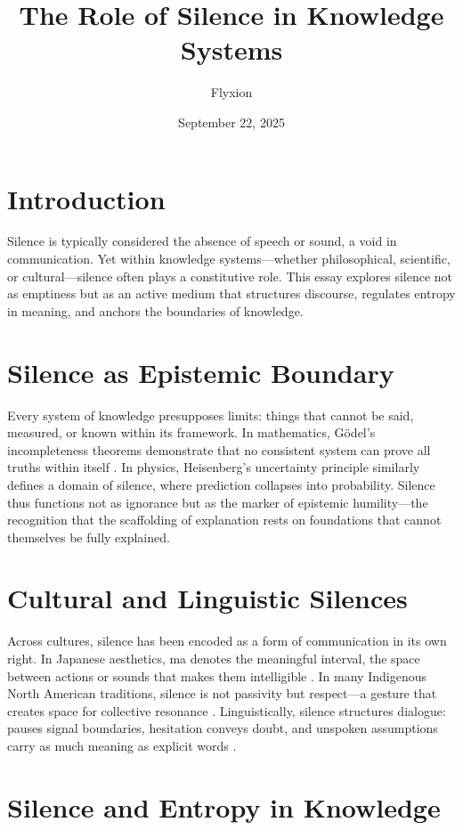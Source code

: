\documentclass[11pt,a4paper]{article}
\title{The Role of Silence in Knowledge Systems}
\author{Flyxion}
\date{September 22, 2025}
\begin{document}
\maketitle

\section{Introduction}

Silence is typically considered the absence of speech or sound, a void in communication. Yet within knowledge systems—whether philosophical, scientific, or cultural—silence often plays a constitutive role. This essay explores silence not as emptiness but as an active medium that structures discourse, regulates entropy in meaning, and anchors the boundaries of knowledge.

\section{Silence as Epistemic Boundary}

Every system of knowledge presupposes limits: things that cannot be said, measured, or known within its framework. In mathematics, Gödel’s incompleteness theorems demonstrate that no consistent system can prove all truths within itself \citep{godel1931}. In physics, Heisenberg’s uncertainty principle \citep{heisenberg1927} similarly defines a domain of silence, where prediction collapses into probability. Silence thus functions not as ignorance but as the marker of epistemic humility—the recognition that the scaffolding of explanation rests on foundations that cannot themselves be fully explained.

\section{Cultural and Linguistic Silences}

Across cultures, silence has been encoded as a form of communication in its own right. In Japanese aesthetics, ma denotes the meaningful interval, the space between actions or sounds that makes them intelligible \citep{isozaki2006}. In many Indigenous North American traditions, silence is not passivity but respect—a gesture that creates space for collective resonance \citep{basso1970}. Linguistically, silence structures dialogue: pauses signal boundaries, hesitation conveys doubt, and unspoken assumptions carry as much meaning as explicit words \citep{jaworski1993}.

\section{Silence and Entropy in Knowledge}
\end{document}
